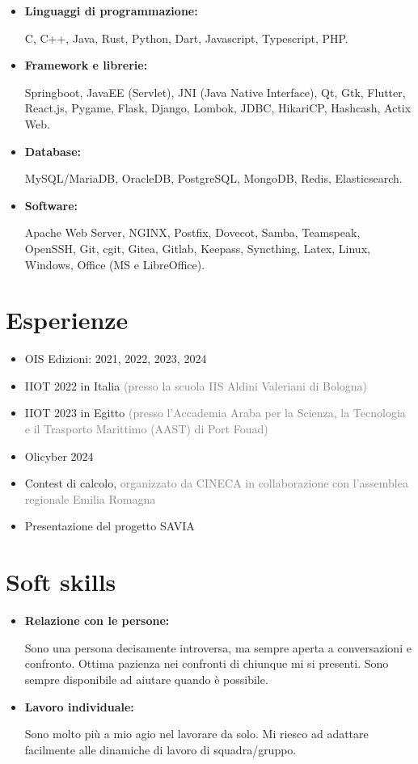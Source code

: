 \documentclass{paper}
\begin{document}
\begin{itemize}
    \item \textbf{Linguaggi di programmazione:}
    
    C, C++, Java, Rust, Python, Dart, Javascript, Typescript, PHP.

    \item \textbf{Framework e librerie:}
    
    Springboot, JavaEE (Servlet), JNI (Java Native Interface), Qt, Gtk, Flutter, React.js, Pygame, Flask, Django, Lombok, JDBC, HikariCP, Hashcash, Actix Web.

    \item \textbf{Database:}
    
    MySQL/MariaDB, OracleDB, PostgreSQL, MongoDB, Redis, Elasticsearch.

    \item \textbf{Software:}
    
    Apache Web Server, NGINX, Postfix, Dovecot, Samba, Teamspeak, OpenSSH, Git, cgit, Gitea, Gitlab, Keepass, Syncthing, Latex, Linux, Windows, Office (MS e LibreOffice).
\end{itemize}

\section{Esperienze}

\begin{itemize}
    \item OIS Edizioni: 2021, 2022, 2023, 2024
    \item IIOT 2022 in Italia \textcolor{gray}{(presso la scuola IIS Aldini Valeriani di Bologna)}
    \item IIOT 2023 in Egitto \textcolor{gray}{(presso l'Accademia Araba per la Scienza, la Tecnologia e il Trasporto Marittimo (AAST) di Port Fouad)}
    \item Olicyber 2024
    \item Contest di calcolo, \textcolor{gray}{organizzato da CINECA in collaborazione con l'assemblea regionale Emilia Romagna}
    \item Presentazione del progetto SAVIA
\end{itemize}

\section{Soft skills}

\begin{itemize}
    \item \textbf{Relazione con le persone:}
    
    Sono una persona decisamente introversa, ma sempre aperta a conversazioni e confronto.
    Ottima pazienza nei confronti di chiunque mi si presenti.
    Sono sempre disponibile ad aiutare quando è possibile.

    \item \textbf{Lavoro individuale:}
    
    Sono molto più a mio agio nel lavorare da solo.
    Mi riesco ad adattare facilmente alle dinamiche di lavoro di squadra/gruppo.
\end{itemize}
\end{document}

